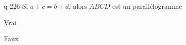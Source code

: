 \begin{truefalse}{q-226}
Si $a+c=b+d$, alors $ABCD$ est un parallélogramme
\item* Vrai
\item Faux
\end{truefalse}

